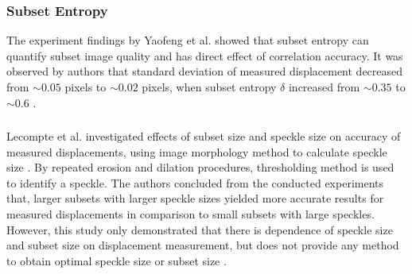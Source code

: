     \subsubsection{Subset Entropy}
        The experiment findings by Yaofeng et al. showed that subset entropy can quantify subset image quality and has direct effect of correlation accuracy. It was observed by authors that standard deviation of measured displacement decreased from $\sim 0.05$ pixels to $\sim 0.02$ pixels, when subset entropy $\delta$ increased from $\sim 0.35$ to $\sim 0.6$ \cite{yaofeng}.

    \subsubsection{}
        Lecompte et al. investigated effects of subset size and speckle size on accuracy of measured displacements, using image morphology method to calculate speckle size \cite{lecompte}. By repeated erosion and dilation procedures, thresholding method is used to identify a speckle. The authors concluded from the conducted experiments that, larger subsets with larger speckle sizes yielded more accurate results for measured displacements in comparison to small subsets with large speckles. However, this study only demonstrated that there is dependence of speckle size and subset size on displacement measurement, but does not provide any method to obtain optimal speckle size or subset size \cite{lecompte}.





